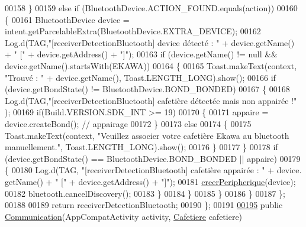 \begin{DoxyCode}
00158                 \}
00159                 \textcolor{keywordflow}{else} \textcolor{keywordflow}{if} (BluetoothDevice.ACTION\_FOUND.equals(action))
00160                 \{
00161                     BluetoothDevice device = intent.getParcelableExtra(BluetoothDevice.EXTRA\_DEVICE);
00162                     Log.d(TAG,\textcolor{stringliteral}{"[receiverDetectionBluetooth] device détecté : "} + device.getName() + \textcolor{stringliteral}{" ["} + 
      device.getAddress() + \textcolor{stringliteral}{"]"});
00163                     \textcolor{keywordflow}{if} (device.getName() != null && device.getName().startsWith(EKAWA))
00164                     \{
00165                         Toast.makeText(context, \textcolor{stringliteral}{"Trouvé : "} + device.getName(), Toast.LENGTH\_LONG).show();
00166                         \textcolor{keywordflow}{if} (device.getBondState() != BluetoothDevice.BOND\_BONDED)
00167                         \{
00168                             Log.d(TAG,\textcolor{stringliteral}{"[receiverDetectionBluetooth] cafetière détectée mais non appairée !"}
      );
00169                             \textcolor{keywordflow}{if}(Build.VERSION.SDK\_INT >= 19)
00170                             \{
00171                                 appaire = device.createBond(); \textcolor{comment}{// appairage}
00172                             \}
00173                             \textcolor{keywordflow}{else}
00174                             \{
00175                                 Toast.makeText(context, \textcolor{stringliteral}{"Veuillez associer votre cafetière Ekawa au
       bluetooth manuellement."}, Toast.LENGTH\_LONG).show();
00176                             \}
00177                         \}
00178                         \textcolor{keywordflow}{if} (device.getBondState() == BluetoothDevice.BOND\_BONDED || appaire)
00179                         \{
00180                             Log.d(TAG, \textcolor{stringliteral}{"[receiverDetectionBluetooth] cafetière appairée : "} + device.
      getName() + \textcolor{stringliteral}{" ["} + device.getAddress() + \textcolor{stringliteral}{"]"});
00181                             \hyperlink{classcom_1_1example_1_1ekawa_1_1_communication_a41f24da10de9e598f65941bf55320566}{creerPeripherique}(device);
00182                             bluetooth.cancelDiscovery();
00183                         \}
00184                     \}
00185                 \}
00186             \}
00187         \};
00188 
00189         \textcolor{keywordflow}{return} receiverDetectionBluetooth;
00190     \};
00191 
\hyperlink{classcom_1_1example_1_1ekawa_1_1_communication_a78557db29f39808417c9fa4435b90d3b}{00195}     \textcolor{keyword}{public} \hyperlink{classcom_1_1example_1_1ekawa_1_1_communication_a78557db29f39808417c9fa4435b90d3b}{Communication}(AppCompatActivity activity, \hyperlink{classcom_1_1example_1_1ekawa_1_1_cafetiere}{Cafetiere} cafetiere)

\end{DoxyCode}
